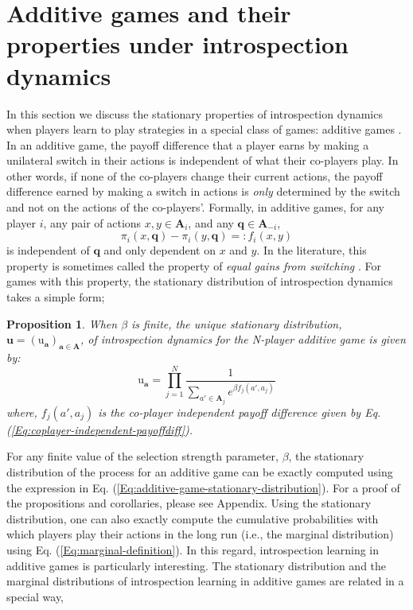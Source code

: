 \documentclass[11pt]{article}
\theoremstyle{plainCl1}
\newtheorem{Prop}{Proposition}
\theoremstyle{plainCl2}
\newcommand{\A}{\mathbf{A}}
\newcommand{\abf}{\mathbf{a}}
\newcommand{\qbf}{\mathbf{q}}
\newcommand{\ubf}{\mathbf{u}}
\begin{document}
\section*{Additive games and their properties under introspection dynamics}
In this section we discuss the stationary properties of introspection dynamics when players learn to play strategies in a special class of games: additive games \cite{McAvoy:PlosCB:2015, Pena:JTB:2014}. In an additive game, the payoff difference that a player earns by making a unilateral switch in their actions is independent of what their co-players play. In other words, if none of the co-players change their current actions, the payoff difference earned by making a switch in actions is \emph{only} determined by the switch and not on the actions of the co-players'. Formally, in additive games, for any player $i$, any pair of actions $x,y \in \A_i$, and any $\qbf \in \A_{-i}$,
\begin{equation}
\pi_i(x, \qbf) - \pi_i(y, \qbf) =: f_i(x,y) 
\label{Eq:coplayer-independent-payoffdiff}
\end{equation}
\noindent is independent of $\qbf$ and only dependent on $x$ and $y$. In the literature, this property is sometimes called the property of \emph{equal gains from switching} \cite{Pena:JTB:2014}. For games with this property, the stationary distribution of introspection dynamics takes a simple form;

 \begin{Prop}
When $\beta$ is finite, the unique stationary distribution, $\ubf = (\mathrm{u}_\abf)_{\abf \in \A}$, of introspection dynamics for the N-player additive game is given by: 
\begin{equation}
\mathrm{u}_\abf = \prod_{j=1}^N \frac{1}{\displaystyle \sum_{a' \in \A_j} e^{\beta f_j(a', a_j)}} 
\label{Eq:additive-game-stationary-distribution}
\end{equation}
where, $f_j(a', a_j)$ is the co-player independent payoff difference given by Eq. (\ref{Eq:coplayer-independent-payoffdiff}).

\label{Th:additive-games-stationary-dist}
\end{Prop}
\noindent For any finite value of the selection strength parameter, $\beta$, the stationary distribution of the process for an additive game can be exactly computed using the expression in Eq. (\ref{Eq:additive-game-stationary-distribution}). For a proof of the propositions and corollaries, please see Appendix. Using the stationary distribution, one can also exactly compute the cumulative probabilities with which players play their actions in the long run (i.e., the marginal distribution) using Eq. (\ref{Eq:marginal-definition}). In this regard, introspection learning in additive games is particularly interesting. The stationary distribution and the marginal distributions of introspection learning in additive games are related in a special way, 
\end{document}

